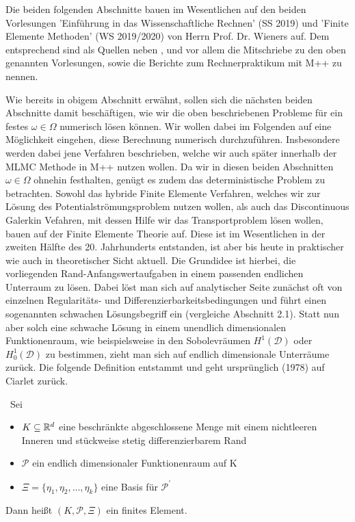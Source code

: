 \label{num_pot}
\begin{Bemerkung}
	Die beiden folgenden Abschnitte bauen im Wesentlichen auf den beiden Vorlesungen 'Einführung in das Wissenschaftliche Rechnen' (SS 2019) und 'Finite Elemente Methoden' (WS 2019/2020) von Herrn Prof. Dr. Wieners auf. Dem entsprechend sind als Quellen neben \cite{brenner2007mathematical},
	\cite{braess2013finite} und \cite{hanke2002grundlagen} vor allem die Mitschriebe zu den oben genannten Vorlesungen, sowie die Berichte zum Rechnerpraktikum mit M++ \cite{siteM++} zu nennen.
\end{Bemerkung}
Wie bereits in obigem Abschnitt erwähnt, sollen sich die nächsten beiden Abschnitte damit beschäftigen, wie wir die oben beschriebenen Probleme für ein festes $\omega \in \Omega$ numerisch lösen können. 
Wir wollen dabei im Folgenden auf eine Möglichkeit eingehen, diese Berechnung numerisch durchzuführen. Insbesondere werden dabei jene Verfahren beschrieben, welche wir auch später innerhalb der MLMC Methode in M++ nutzen wollen.
Da wir in diesen beiden Abschnitten $\omega \in \Omega$ ohnehin festhalten, genügt es zudem das deterministische Problem zu betrachten. \newline
Sowohl das hybride Finite Elemente Verfahren, welches wir zur Lösung des Potentialströmungsproblem nutzen wollen, als auch das Discontinuous Galerkin Vefahren, mit dessen Hilfe wir das Transportproblem lösen wollen, bauen auf der Finite Elemente Theorie auf. 
Diese ist im Wesentlichen in der zweiten Hälfte des 20. Jahrhunderts entstanden, ist aber bis heute in praktischer wie auch in theoretischer Sicht aktuell.
Die Grundidee ist hierbei, die vorliegenden Rand-Anfangswertaufgaben in einem passenden endlichen Unterraum zu lösen. Dabei löst man sich auf analytischer Seite zunächst oft von einzelnen Regularitäts- und Differenzierbarkeitsbedingungen und führt einen sogenannten schwachen Lösungsbegriff ein (vergleiche Abschnitt 2.1). Statt nun aber solch eine schwache Lösung in einem unendlich dimensionalen Funktionenraum, wie beispielsweise in den Sobolevräumen $H^1(\mathcal{D})$ oder $H_0^1(\mathcal{D})$ zu bestimmen, zieht man sich auf endlich dimensionale Unterräume zurück. \newline
Die folgende Definition entstammt \cite{brenner2007mathematical} und geht ursprünglich (1978) auf Ciarlet zurück.
\begin{Definition}\
	Sei
	\begin{itemize}
		\item $K \subseteq \mathbb{R}^d$ eine beschränkte abgeschlossene Menge mit einem nichtleeren Inneren und stückweise stetig differenzierbarem Rand 
		\item $\mathcal{P}$ ein endlich dimensionaler Funktionenraum auf K
		\item $\Xi = \{\eta_1,\eta_2,\dots,\eta_k \}$ eine Basis für $\mathcal{P}^{'}$
	\end{itemize}
	Dann heißt $(K,\mathcal{P},\Xi)$ ein finites Element.
\end{Definition}

